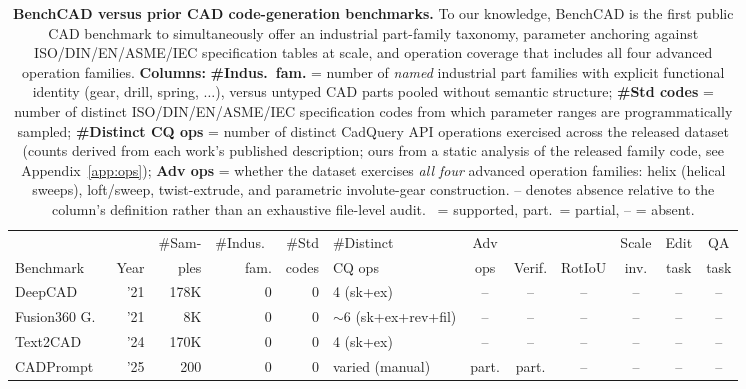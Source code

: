 \documentclass{article}
\newcommand{\cmark}{\ding{51}}
\begin{document}
\begin{table}[t]
\centering
\small
\setlength{\tabcolsep}{3pt}
\caption{\textbf{BenchCAD versus prior CAD code-generation benchmarks.} To our knowledge, BenchCAD is the first public CAD benchmark to simultaneously offer an industrial part-family taxonomy, parameter anchoring against ISO/DIN/EN/ASME/IEC specification tables at scale, and operation coverage that includes all four advanced operation families. \textbf{Columns:} \textbf{\#Indus.\ fam.} = number of \emph{named} industrial part families with explicit functional identity (gear, drill, spring, $\ldots$), versus untyped CAD parts pooled without semantic structure; \textbf{\#Std codes} = number of distinct ISO/DIN/EN/ASME/IEC specification codes from which parameter ranges are programmatically sampled; \textbf{\#Distinct CQ ops} = number of distinct CadQuery API operations exercised across the released dataset (counts derived from each work's published description; ours from a static analysis of the released family code, see Appendix~\ref{app:ops}); \textbf{Adv ops} = whether the dataset exercises \emph{all four} advanced operation families: helix (helical sweeps), loft/sweep, twist-extrude, and parametric involute-gear construction. -- denotes absence relative to the column's definition rather than an exhaustive file-level audit. \cmark$\,$ = supported, part.\, = partial, -- = absent.}
\label{tab:cmp_prior}
\begin{tabular}{lrrrrlcccccc}
\toprule
                                    &      & \#Sam-  & \#Indus.\ & \#Std  & \#Distinct                & Adv  &        &        & Scale & Edit & QA \\
Benchmark                           & Year & ples    & fam.      & codes  & CQ ops                    & ops  & Verif. & RotIoU & inv.  & task & task \\
\midrule
DeepCAD~\citep{Wu2021}              & '21 & 178K   & 0    & 0   & 4 (sk+ex)                       & --     & --     & --     & --     & --     & --     \\
Fusion360 G.~\citep{Willis2021fusion} & '21 & 8K   & 0    & 0   & $\sim$6 (sk+ex+rev+fil)         & --     & --     & --     & --     & --     & --     \\
Text2CAD~\citep{Khan2024}           & '24 & 170K   & 0    & 0   & 4 (sk+ex)                       & --     & --     & --     & --     & --     & --     \\
CADPrompt~\citep{Alrashedy2025}     & '25 & 200    & 0    & 0   & varied (manual)                 & part.  & part.  & --     & --     & --     & --     \\

\end{tabular}
\end{table}
\end{document}
